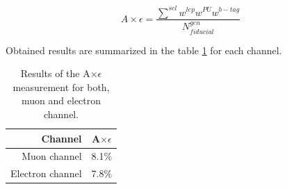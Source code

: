 \begin{equation}
A\times \epsilon = \frac{\sum^{sel} w^{lep} w^{PU} w^{b-tag}}{N_{fiducial}^{gen}}
\end{equation}

Obtained results are summarized in the table \ref{tab:AE} for each channel.

\begin{table}[!htb]
\begin{center}
   \begin{tabular} {r c} \hline \hline
        Channel         & A$\times \epsilon$ \\
        \hline
        Muon channel         & 8.1$\%$ \\
        Electron channel     & 7.8$\%$ \\
        \hline\hline
   \end{tabular}
\caption{Results of the A$\times \epsilon$ measurement for both, muon and electron channel.}
\label{tab:AE}
\end{center}
\end{table}


